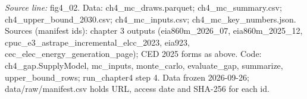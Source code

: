 {\scriptsize\textit{Source line:} fig4\_\allowbreak{}02. Data: ch4\_\allowbreak{}mc\_\allowbreak{}draws.parquet; ch4\_\allowbreak{}mc\_\allowbreak{}summary.csv; ch4\_\allowbreak{}upper\_\allowbreak{}bound\_\allowbreak{}2030.csv; ch4\_\allowbreak{}mc\_\allowbreak{}inputs.csv; ch4\_\allowbreak{}mc\_\allowbreak{}key\_\allowbreak{}numbers.json. Sources (manifest ids): chapter 3 outputs (eia860m\_\allowbreak{}2026\_\allowbreak{}07, eia860m\_\allowbreak{}2025\_\allowbreak{}12, cpuc\_\allowbreak{}e3\_\allowbreak{}astrape\_\allowbreak{}incremental\_\allowbreak{}elcc\_\allowbreak{}2023, eia923, cec\_\allowbreak{}elec\_\allowbreak{}energy\_\allowbreak{}generation\_\allowbreak{}page); CED 2025 forms as above. Code: ch4\_\allowbreak{}gap.SupplyModel, mc\_\allowbreak{}inputs, monte\_\allowbreak{}carlo, evaluate\_\allowbreak{}gap, summarize, upper\_\allowbreak{}bound\_\allowbreak{}rows; run\_\allowbreak{}chapter4 step 4. Data frozen 2026-09-26; data/raw/manifest.csv holds URL, access date and SHA-256 for each id.}